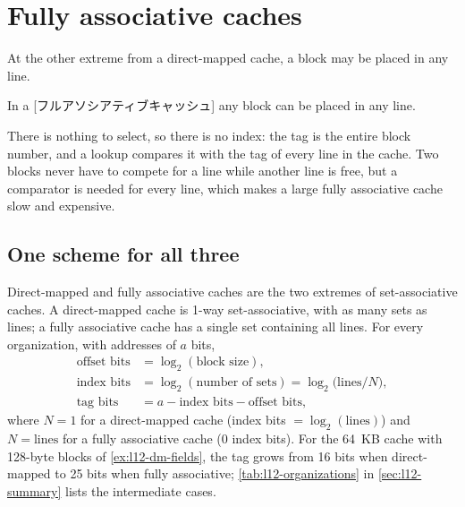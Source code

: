 \documentclass[../main.tex]{subfiles}
\begin{document}
\section{Fully associative caches}
\label{sec:l12-fa}

At the other extreme from a direct-mapped cache, a block may be placed in any
line.

\begin{definition}
  In a [フルアソシアティブキャッシュ] any
  block can be placed in any line.
\end{definition}

There is nothing to select, so there is no index: the tag is the entire
block number, and a lookup compares it with the tag of every line in the
cache.  Two blocks never have to compete for a line while another line is
free, but a comparator is needed for every line, which makes a large fully
associative cache slow and expensive.

\subsection{One scheme for all three}

Direct-mapped and fully associative caches are the two extremes of
set-associative caches.  A direct-mapped cache is 1-way set-associative, with
as many sets as lines; a fully associative cache has a single set containing
all lines.  For every organization, with addresses of $a$ bits,
\begin{equation}
  \begin{aligned}
    \text{offset bits} &= \log_2(\text{block size}), \\
    \text{index bits}  &= \log_2(\text{number of sets})
                        = \log_2\bigl(\text{lines}/N\bigr), \\
    \text{tag bits}    &= a - \text{index bits} - \text{offset bits} ,
  \end{aligned}
  \label{eq:l12-fields}
\end{equation}
where $N=1$ for a direct-mapped cache (index bits $= \log_2(\text{lines})$)
and $N = \text{lines}$ for a fully associative cache (0 index bits).  For
the 64~KB cache with 128-byte blocks of
\cref{ex:l12-dm-fields}, the tag grows from 16 bits when direct-mapped to
25 bits when fully associative; \cref{tab:l12-organizations} in
\cref{sec:l12-summary} lists the intermediate cases.
\end{document}
